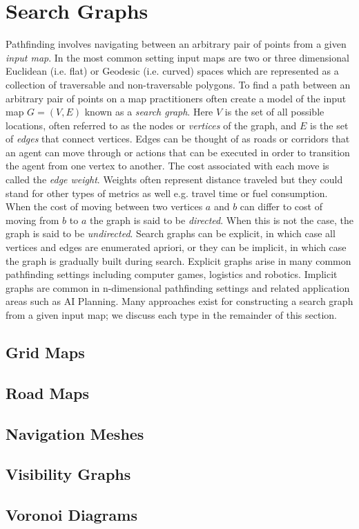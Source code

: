 \section{Search Graphs}
\label{cha::lit::graphs}
Pathfinding involves navigating between an arbitrary pair of points from a given 
\emph{input map}.
In the most common setting input maps are two or three dimensional
Euclidean (i.e. flat) or Geodesic (i.e. curved) spaces which are represented as
a collection of traversable and non-traversable polygons.
To find a path between an arbitrary pair of points on a map practitioners often
create a model of the input map $G = (V, E)$ known as a \emph{search graph}.
Here $V$ is the set of all possible locations, often referred to as the nodes or
\emph{vertices} of the graph, and $E$ is the set of \emph{edges} that connect
vertices.  Edges can be thought of as roads or corridors that an agent can move 
through or actions that can be executed in order to transition the agent from one 
vertex to another.
The cost associated with each move is called the \emph{edge weight}.
Weights often represent distance traveled but they could stand for other
types of metrics as well e.g. travel time or fuel consumption.
When the cost of moving between two vertices $a$ and $b$ can differ to
cost of moving from $b$ to $a$ the graph is said to be \emph{directed}.
When this is not the case, the graph is said to be \emph{undirected}.
Search graphs can be explicit, in which case all vertices and edges
are enumerated apriori, or they can be implicit, in which case the graph is 
gradually built during search. Explicit graphs arise in many common pathfinding
settings including computer games, logistics and robotics. Implicit graphs are
common in n-dimensional pathfinding settings and related application areas such
as AI Planning.
Many approaches exist for constructing a search graph from a given input map; we 
discuss each type in the remainder of this section.

%

\subsection{Grid Maps}

\subsection{Road Maps}

\subsection{Navigation Meshes}

\subsection{Visibility Graphs}

\subsection{Voronoi Diagrams}

